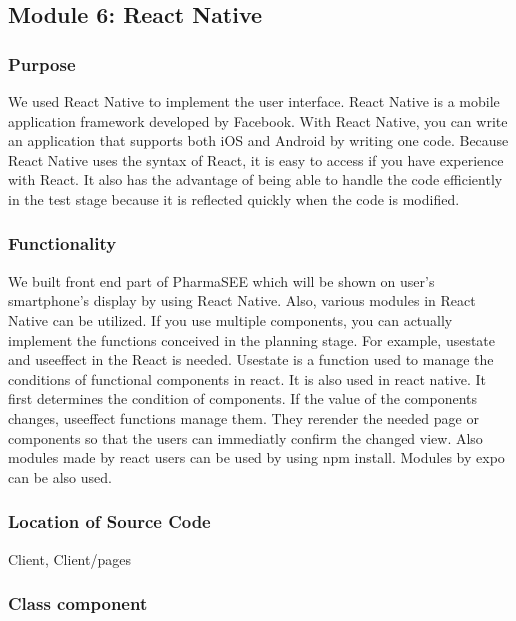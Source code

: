 \documentclass[conference]{IEEEtran}
\begin{document}
\subsection{Module 6: React Native}

\subsubsection{Purpose}
We used React Native to implement the user interface. React Native is a mobile application framework developed by Facebook. With React Native, you can write an application that supports both iOS and Android by writing one code. Because React Native uses the syntax of React, it is easy to access if you have experience with React. It also has the advantage of being able to handle the code efficiently in the test stage because it is reflected quickly when the code is modified.\\

\subsubsection{Functionality}
 We built front end part of PharmaSEE which will be shown on user's smartphone's display by using React Native. Also, various modules in React Native can be utilized. If you use multiple components, you can actually implement the functions conceived in the planning stage. For example, usestate and useeffect in the React is needed. Usestate is a function used to manage the conditions of functional components in react. It is also used in react native. It first determines the condition of components. If the value of the components changes, useeffect functions manage them. They rerender the needed page or components so that the users can immediatly confirm the changed view. Also modules made by react users can be used by using npm install. Modules by expo can be also used.  \\
 
\subsubsection{Location of Source Code}
Client, Client/pages\\

\subsubsection{Class component}
\\
\end{document}
